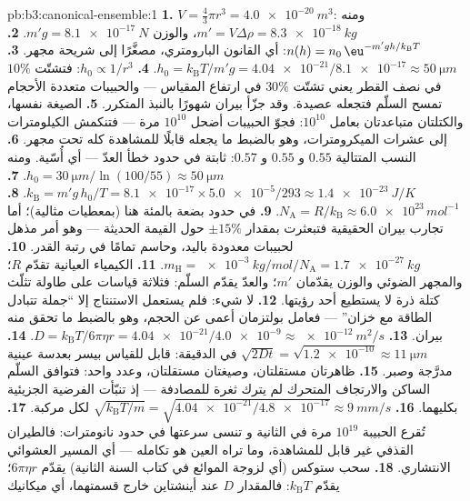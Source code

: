 \begin{solution}{pb:b3:canonical-ensemble:1}
\textbf{1.} $V = \tfrac43\pi r^3 = \qty{4.0e-20}{m^3}$: ومنه $m' = V
\Delta\rho = \qty{8.3e-18}{kg}$، والوزن $m'g = \qty{8.1e-17}{N}$.
\textbf{2.} $n(h) = n_0\,\eu^{-m'gh/k_{\text{B}}T}$: أي
القانون البارومتري، مصغَّرًا إلى شريحة مجهر.
\textbf{3.} $h_0 = k_{\text{B}}T/m'g = \num{4.04e-21}/\num{8.1e-17}
\approx \qty{50}{\micro m}$.
\textbf{4.} $h_0 \propto 1/r^3$: فتشتّت $10\%$ في نصف القطر يعني
تشتّت $30\%$ في ارتفاع المقياس --- والحبيبات متعددة الأحجام تمسح
السلّم فتجعله عصيدة. وقد جزّأ بيران شهورًا بالنبذ
المتكرر.
\textbf{5.} الصيغة نفسها، والكتلتان متباعدتان بعامل $10^{10}$: فجوّ
الحبيبات أضحل $10^{10}$ مرة --- فتنكمش الكيلومترات
إلى عشرات الميكرومترات، وهو بالضبط ما يجعله
قابلًا للمشاهدة كله تحت مجهر.
\textbf{6.} النسب المتتالية $0.55$ و $0.55$ و $0.57$: ثابتة
في حدود خطأ العدّ --- أي أُسّية. ومنه $h_0 =
\qty{30}{\micro m}/\ln(100/55) \approx \qty{50}{\micro m}$.
\textbf{7.} $k_{\text{B}} = m'g\,h_0/T = \num{8.1e-17} \times
\num{5.0e-5}/293 \approx \qty{1.4e-23}{J/K}$.
\textbf{8.} $N_{\text{A}} = R/k_{\text{B}} \approx
\num{6.0e23}\,\unit{mol^{-1}}$.
\textbf{9.} في حدود بضعة بالمئة هنا (بمعطيات مثالية)؛ أما
تجارب بيران الحقيقية فتبعثرت بمقدار $\pm15\%$ حول القيمة الحديثة
--- وهو أمر مذهل لحبيبات معدودة باليد، وحاسم تمامًا
في رتبة القدر.
\textbf{10.} $m_{\text{H}} = \qty{e-3}{kg/mol}/N_{\text{A}} =
\qty{1.7e-27}{kg}$.
\textbf{11.} الكيمياء العيانية تقدّم $R$؛ والمجهر الضوئي
والوزن يقدّمان $m'$؛ والعدّ يقدّم السلّم: فثلاثة
قياسات على طاولة تثلّث كتلة ذرة لا يستطيع أحد
رؤيتها.
\textbf{12.} لا شيء: فلم يستعمل الاستنتاج إلا ``جملة
تتبادل الطاقة مع خزان'' --- فعامل بولتزمان
أعمى عن الحجم، وهو بالضبط ما تحقق منه بيران.
\textbf{13.} $D = k_{\text{B}}T/6\pi\eta r =
\num{4.04e-21}/\num{4.0e-9} \approx \qty{e-12}{m^2/s}$.
\textbf{14.} $\sqrt{2Dt} = \sqrt{\num{1.2e-10}} \approx
\qty{11}{\micro m}$ في الدقيقة: قابل للقياس بيسر بعدسة
عينية مدرَّجة وصبر.
\textbf{15.} ظاهرتان مستقلتان، وصيغتان مستقلتان،
وعدد واحد: فتوافق السلّم الساكن والارتجاف المتحرك
لم يترك ثغرة للمصادفة --- إذ تنبّأت الفرضية الجزيئية
بكليهما.
\textbf{16.} $\sqrt{k_{\text{B}}T/m} = \sqrt{\num{4.04e-21}/
\num{4.8e-17}} \approx \qty{9}{mm/s}$ لكل مركبة.
\textbf{17.} تُقرع الحبيبة $10^{19}$ مرة في الثانية و
تنسى سرعتها في حدود نانومترات: فالطيران القذفي
غير قابل للمشاهدة، وما تراه العين هو تكامله ---
أي المسير العشوائي الانتشاري.
\textbf{18.} سحب ستوكس (أي لزوجة الموائع في كتاب السنة
الثانية) يقدّم $6\pi\eta r$؛  يقدّم
$k_{\text{B}}T$: فالمقدار $D$ عند أينشتاين خارج قسمتهما، أي ميكانيك

\end{solution}
